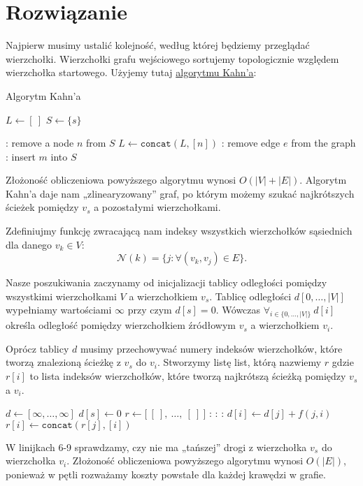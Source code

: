 \documentclass[14pt]{article}
\begin{document}
\section{Rozwiązanie}

Najpierw musimy ustalić kolejność, według której będziemy przeglądać wierzchołki. Wierzchołki grafu wejściowego sortujemy topologicznie względem wierzchołka startowego. Użyjemy tutaj \href{https://en.wikipedia.org/wiki/Topological_sorting#Kahn's_algorithm}{algorytmu Kahn'a}:

\begin{algorithm}
  \caption{Algorytm Kahn'a}
  \label{kahn}
  \begin{algorithmic}[1]
    \State $L \gets [~]$
    \State $S \gets \{s\}$

    :
      \State remove a node $n$ from $S$
      \State $L \gets \texttt{concat}(L, [n])$
      :
        \State remove edge $e$ from the graph
        :
          \State insert $m$ into $S$
        \EndIf
      \EndFor
    \EndWhile
  \end{algorithmic}
\end{algorithm}
Złożoność obliczeniowa powyższego algorytmu wynosi $O(|V| + |E|)$. Algorytm Kahn'a daje nam „zlinearyzowany” graf, po którym możemy szukać najkrótszych ścieżek pomiędzy $v_s$ a pozostałymi wierzchołkami.

Zdefiniujmy funkcję zwracającą nam indeksy wszystkich wierzchołków sąsiednich dla danego $v_k \in V$:
$$
\mathcal{N}(k) = \{j: \forall(v_k,v_j) \in E\}.
$$

Nasze poszukiwania zaczynamy od inicjalizacji tablicy odległości pomiędzy wszystkimi wierzchołkami $V$ a wierzchołkiem $v_s$.
Tablicę odległości $d[0,\dots,|V|]$ wypełniamy wartościami $\infty$ przy czym $d[s] = 0$. Wówczas $\forall_{i\in\{0,\dots,|V|\}}~ d[i]$ określa odległość pomiędzy wierzchołkiem źródłowym $v_s$ a wierzchołkiem $v_i$.

Oprócz tablicy $d$ musimy przechowywać numery indeksów wierzchołków, które tworzą znalezioną ścieżkę z $v_s$ do $v_i$. Stworzymy listę list, którą nazwiemy $r$ gdzie $r[i]$ to lista indeksów wierzchołków, które tworzą najkrótszą ścieżką pomiędzy $v_s$ a $v_i$.

\begin{algorithm}[H]
  \begin{algorithmic}[1]
    \State $d \gets [\infty,\dots,\infty]$
    \State $d[s] \gets 0$
    \State $r \gets \big[~[~],~\dots,~[~]~\big]$
    :
      :
        :
          \State $d[i] \gets d[j] + f(j,i)$
          \State $r[i] \gets \texttt{concat}(r[j], [i])$
        \EndIf
      \EndFor
    \EndFor
  \end{algorithmic}
\end{algorithm}

W linijkach 6-9 sprawdzamy, czy nie ma „tańszej” drogi z wierzchołka $v_s$ do wierzchołka $v_i$. Złożoność obliczeniowa powyższego algorytmu wynosi $O(|E|)$, ponieważ w pętli rozważamy koszty powstałe dla każdej krawędzi w grafie.
\end{document}
